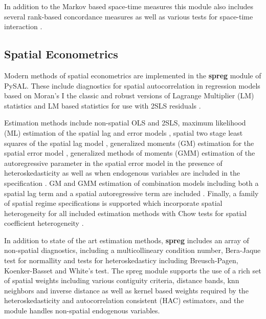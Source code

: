 \documentclass[11pt, titlepage]{article}
\begin{document}
In addition to the Markov based space-time measures this module also
includes several rank-based concordance measures \citep{Rey:2013kq} as
well as various tests for space-time interaction \citep{Knox:1964vo,
Jacquez:1996hh}.

\subsection{Spatial Econometrics}

Modern methods of spatial econometrics are implemented in the
\textbf{spreg} module of PySAL. These include diagnostics for spatial
autocorrelation in regression models based on Moran's I
\citep{Cliff:1981dt} the classic and robust versions of Lagrange
Multiplier (LM) statistics \citep{Anselin:1991fk,Anselin:1996ge}  and
LM based statistics for use with 2SLS residuals \citep{Anselin:1997lr}.

Estimation methods include non-spatial OLS and 2SLS, maximum likelihood
(ML) estimation of the spatial lag and error models \citep{Ord:1975fk,
Anselin:1980ft, Anselin:1988wi, Smirnov:2001fk}, spatial two stage least
squares of the spatial lag model \citep{Anselin:1980ft, Anselin:1988wi},
generalized moments (GM) estimation for the spatial error model
\cite{Kelejian:1998dn}, generalized methods of moments (GMM) estimation
of the autoregressive parameter in the spatial error model in the
presence of heteroskedasticity  as well as when endogenous variables are
included in the specification \citep{Kelejian:2010fp}. GM and GMM
estimation of combination models including both a spatial lag term and a
spatial autoregressive term are included \citep{Kelejian:1998ec,
Arraiz:2010dq, Drukker:2013mi}. Finally, a family of spatial regime
specifications is supported which incorporate spatial heterogeneity for
all included estimation methods with Chow tests for spatial coefficient
heterogeneity \citep{Anselin:1990ye}.

In addition to state of the art estimation methods, \textbf{spreg} includes an
array of  non-spatial diagnostics, including a
multicollineary condition number, Bera-Jaque test for normallity and
tests for heteroskedasticy including Breusch-Pagen, Koenker-Basset and
White's test. The spreg module supports the use of a rich set of
spatial weights including various contiguity criteria, distance bands,
knn neighbors and inverse distance as well as kernel based weights
required by the heteroskedasticity and autocorrelation consistent (HAC)
estimators, and the module handles non-spatial endogenous variables.
\end{document}
